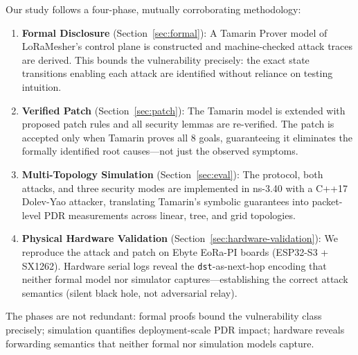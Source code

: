 \documentclass[preprint,12pt]{elsarticle}
\begin{document}
Our study follows a four-phase, mutually corroborating methodology:

\begin{enumerate}[label=\textbf{Phase \arabic*.}]
  \item \textbf{Formal Disclosure} (Section~\ref{sec:formal}):
    A Tamarin Prover model of LoRaMesher's control plane is
    constructed and machine-checked attack traces are derived.
    This bounds the vulnerability precisely: the exact state
    transitions enabling each attack are identified without reliance
    on testing intuition.

  \item \textbf{Verified Patch} (Section~\ref{sec:patch}):
    The Tamarin model is extended with proposed patch rules and all
    security lemmas are re-verified. The patch is accepted only when
    Tamarin proves all 8 goals, guaranteeing it eliminates the
    formally identified root causes—not just the observed symptoms.

  \item \textbf{Multi-Topology Simulation} (Section~\ref{sec:eval}):
    The protocol, both attacks, and three security modes are
    implemented in ns-3.40 with a C++17 Dolev-Yao attacker,
    translating Tamarin's symbolic guarantees into packet-level
    PDR measurements across linear, tree, and grid topologies.

  \item \textbf{Physical Hardware Validation}
    (Section~\ref{sec:hardware-validation}):
    We reproduce the attack and patch on Ebyte EoRa-PI boards
    (ESP32-S3 + SX1262). Hardware serial logs reveal the
    \texttt{dst}-as-next-hop encoding that neither formal model
    nor simulator captures—establishing the correct attack
    semantics (silent black hole, not adversarial relay).
\end{enumerate}

The phases are not redundant: formal proofs bound the
vulnerability class precisely; simulation quantifies
deployment-scale PDR impact; hardware reveals forwarding
semantics that neither formal nor simulation models capture.
\end{document}
